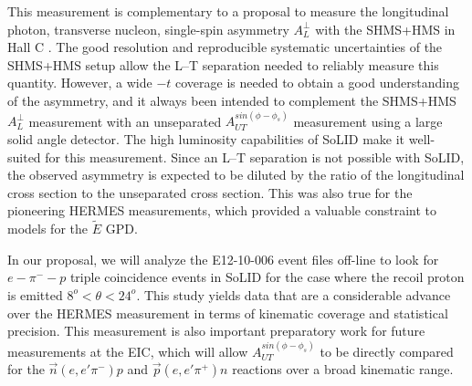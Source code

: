 \documentclass{article}
\begin{document}
This measurement is complementary to a proposal to measure the longitudinal
photon, transverse nucleon, single-spin asymmetry $A_L^{\perp}$ with the
SHMS+HMS in Hall C \cite{atpi39}.  The good resolution and reproducible
systematic uncertainties of the SHMS+HMS setup allow the L--T separation needed
to reliably measure this quantity.  However, a wide $-t$ coverage is needed to
obtain a good understanding of the asymmetry, and it always been intended to
complement the SHMS+HMS $A_L^{\perp}$ measurement with an unseparated
$A_{UT}^{sin(\phi-\phi_s)}$ measurement using a large solid angle detector.
The high luminosity capabilities of SoLID make it well-suited for this
measurement.  Since an L--T separation is not possible with SoLID, the observed
asymmetry is expected to be diluted by the ratio of the longitudinal cross
section to the unseparated cross section.  This was also true for the
pioneering HERMES measurements, which provided a valuable constraint to models
for the $\tilde{E}$ GPD.  

In our proposal, we will analyze the E12-10-006 event files
off-line to look for $e-\pi^--p$ triple coincidence events in SoLID for the
case where the recoil proton is emitted $8^o<\theta<24^o$.  This study yields
data that are a considerable advance over the HERMES measurement in terms of
kinematic coverage and statistical precision. 
This measurement is also important preparatory work for future
measurements at the EIC, which will allow $A_{UT}^{sin(\phi-\phi_s)}$ to be
directly compared for the $\vec{n}(e,e'\pi^-)p$ and $\vec{p}(e,e'\pi^+)n$
reactions over a broad kinematic range.


\newpage
\appendix

%

\end{document}
